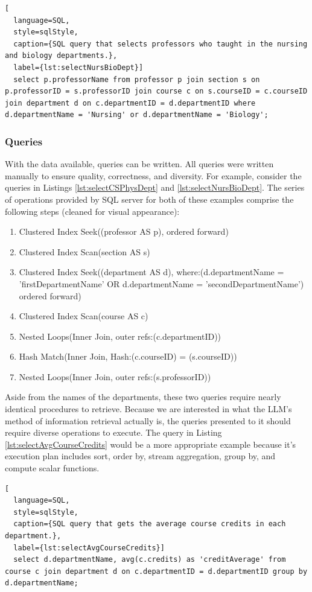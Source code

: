 \begin{lstlisting}[
  language=SQL,
  style=sqlStyle,
  caption={SQL query that selects professors who taught in the nursing and biology departments.},
  label={lst:selectNursBioDept}]
  select p.professorName from professor p join section s on p.professorID = s.professorID join course c on s.courseID = c.courseID join department d on c.departmentID = d.departmentID where d.departmentName = 'Nursing' or d.departmentName = 'Biology';
\end{lstlisting}

\subsubsection{Queries}
With the data available, queries can be written. All queries were written manually to ensure quality, correctness, and diversity. For example, consider the queries in Listings \ref{lst:selectCSPhysDept} and \ref{lst:selectNursBioDept}. The series of operations provided by SQL server for both of these examples comprise the following steps (cleaned for visual appearance):
\begin{enumerate}
  \raggedright
  \item Clustered Index Seek((professor AS p), ordered forward)
  \item Clustered Index Scan(section AS s)
  \item Clustered Index Seek((department AS d),  where:(d.departmentName = 'firstDepartmentName' OR d.departmentName = 'secondDepartmentName') ordered forward)
  \item Clustered Index Scan(course AS c)
  \item Nested Loops(Inner Join, outer refs:(c.departmentID))
  \item Hash Match(Inner Join, Hash:(c.courseID) = (s.courseID))
  \item Nested Loops(Inner Join, outer refs:(s.professorID))
\end{enumerate}
Aside from the names of the departments, these two queries require nearly identical procedures to retrieve. Because we are interested in what the LLM's method of information retrieval actually is, the queries presented to it should require diverse operations to execute. The query in Listing \ref{lst:selectAvgCourseCredits} would be a more appropriate example because it's execution plan includes sort, order by, stream aggregation, group by, and compute scalar functions.

\begin{lstlisting}[
  language=SQL,
  style=sqlStyle,
  caption={SQL query that gets the average course credits in each department.},
  label={lst:selectAvgCourseCredits}]
  select d.departmentName, avg(c.credits) as 'creditAverage' from course c join department d on c.departmentID = d.departmentID group by d.departmentName;
\end{lstlisting}

